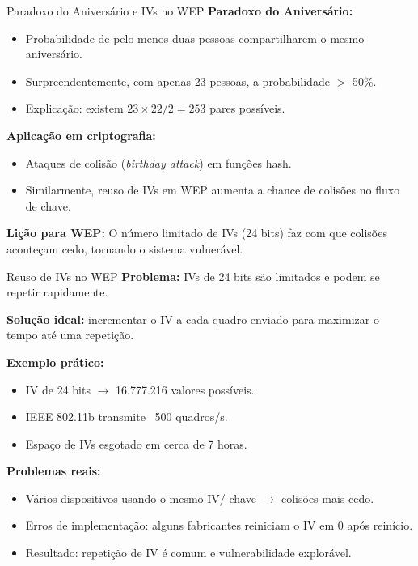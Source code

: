 \begin{frame}{Paradoxo do Aniversário e IVs no WEP}
\textbf{Paradoxo do Aniversário:}
\begin{itemize}
    \item Probabilidade de pelo menos duas pessoas compartilharem o mesmo aniversário.
    \item Surpreendentemente, com apenas 23 pessoas, a probabilidade $>$ 50\%.
    \item Explicação: existem $23 \times 22 / 2 = 253$ pares possíveis.
\end{itemize}

\medskip
\textbf{Aplicação em criptografia:}
\begin{itemize}
    \item Ataques de colisão (\emph{birthday attack}) em funções hash.
    \item Similarmente, reuso de IVs em WEP aumenta a chance de colisões no fluxo de chave.
\end{itemize}

\medskip
\textbf{Lição para WEP:} O número limitado de IVs (24 bits) faz com que colisões aconteçam cedo, tornando o sistema vulnerável.
\end{frame}

\begin{frame}{Reuso de IVs no WEP}
\textbf{Problema:} IVs de 24 bits são limitados e podem se repetir rapidamente.  

\medskip
\textbf{Solução ideal:} incrementar o IV a cada quadro enviado para maximizar o tempo até uma repetição.  

\medskip
\textbf{Exemplo prático:}
\begin{itemize}
    \item IV de 24 bits $\rightarrow$ 16.777.216 valores possíveis.
    \item IEEE 802.11b transmite ~500 quadros/s.
    \item Espaço de IVs esgotado em cerca de 7 horas.
\end{itemize}

\medskip
\textbf{Problemas reais:}
\begin{itemize}
    \item Vários dispositivos usando o mesmo IV/ chave $\rightarrow$ colisões mais cedo.
    \item Erros de implementação: alguns fabricantes reiniciam o IV em 0 após reinício.
    \item Resultado: repetição de IV é comum e vulnerabilidade explorável.
\end{itemize}
\end{frame}

